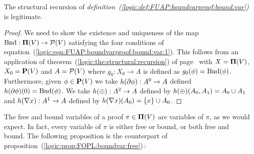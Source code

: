 \begin{prop}\label{logic:prop:FUAP:boundvarproof:recursion}
The structural recursion of {\em
definition~(\ref{logic:def:FUAP:boundvarproof:bound:var})} is
legitimate.
\end{prop}
\begin{proof}
We need to show the existence and uniqueness of the map
$\mbox{\rm Bnd}:\mbox{${\bf\Pi}(V)$}\to{\cal P}(V)$ satisfying the four conditions of
equation~(\ref{logic:eqn:FUAP:boundvarproof:bound:var:1}). This
follows from an application of
theorem~(\ref{logic:the:structural:recursion}) of
page~\pageref{logic:the:structural:recursion} with $X=\mbox{${\bf\Pi}(V)$}$,
$X_{0}=\mbox{${\bf P}(V)$}$ and $A={\cal P}(V)$ where $g_{0}:X_{0}\to A$ is defined
as $g_{0}(\phi)=\mbox{\rm Bnd}(\phi)$. Furthermore, given $\phi\in\mbox{${\bf P}(V)$}$ we
take $h(\mbox{$\partial$}\phi):A^{0}\to A$ defined $h(\mbox{$\partial$}\phi)(0)=\mbox{\rm Bnd}(\phi)$.
We take $h(\mbox{$\oplus$}):A^{2}\to A$ defined by
$h(\mbox{$\oplus$})(A_{0},A_{1})=A_{0}\cup A_{1}$ and $h(\mbox{$\nabla$} x):A^{1}\to A$
defined by $h(\mbox{$\nabla$} x)(A_{0})=\{x\}\cup A_{0}$.
\end{proof}

The free and bound variables of a proof $\pi\in\mbox{${\bf\Pi}(V)$}$ are variables
of $\pi$, as we would expect. In fact, every variable of $\pi$ is
either free or bound, or both free and bound. The following
proposition is the counterpart of
proposition~(\ref{logic:prop:FOPL:boundvar:free})\,:

